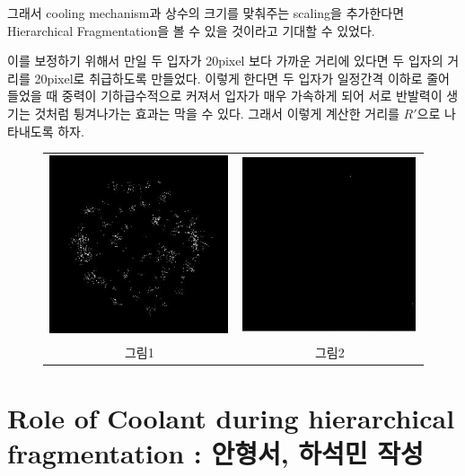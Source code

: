 \documentclass{gshs-hutech}
\begin{document}
그래서 cooling mechanism과 상수의 크기를 맞춰주는 scaling을 추가한다면 Hierarchical Fragmentation을 볼 수 있을 것이라고 기대할 수 있었다. 

이를 보정하기 위해서 만일 두 입자가 20pixel 보다 가까운 거리에 있다면 두 입자의 거리를 20pixel로 취급하도록 만들었다. 이렇게 한다면 두 입자가 일정간격 이하로 줄어들었을 때 중력이 기하급수적으로 커져서 입자가 매우 가속하게 되어 서로 반발력이 생기는 것처럼 튕겨나가는 효과는 막을 수 있다. 그래서 이렇게 계산한 거리를 $R'$으로 나타내도록 하자. 

\begin{figure}[h]
	\centering
	\begin{tabular}{cc}
		\includegraphics[scale=0.6]{im_fig1.jpg}&
		\includegraphics[scale=0.6]{im_fig2.jpg}\\
		그림1 & 그림2
	\end{tabular}
\end{figure}

\section{Role of Coolant during hierarchical fragmentation : 안형서, 하석민 작성} \label{coolant}
\end{document}
